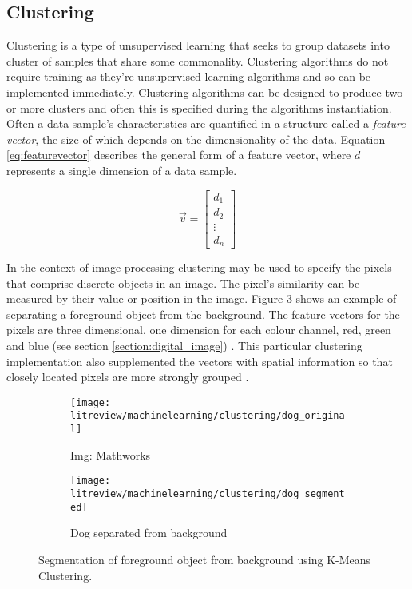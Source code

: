 \subsection{Clustering}
\label{subsection:clustering}
Clustering is a type of unsupervised learning that seeks to group datasets into cluster of samples that share some commonality. Clustering algorithms do not require training as they're unsupervised learning algorithms and so can be implemented immediately. Clustering algorithms can be designed to produce two or more clusters and often this is specified during the algorithms instantiation. Often a data sample's characteristics are quantified in a structure called a \emph{feature vector}, the size of which depends on the dimensionality of the data. Equation \ref{eq:featurevector} describes the general form of a feature vector, where $d$ represents a single dimension of a data sample. 

\begin{equation}
    \vec{v} = 
    \begin{bmatrix}
        d_1 \\
        d_2 \\
        \vdots \\ 
        d_n
    \end{bmatrix}
    \label{eq:featurevector}
\end{equation}

In the context of image processing clustering may be used to specify the pixels that comprise discrete objects in an image. The pixel's similarity can be measured by their value or position in the image. Figure \ref{fig:simple_cluster} shows an example of separating a foreground object from the background. The feature vectors for the pixels are three dimensional, one dimension for each colour channel, red, green and blue (see section \ref{section:digital_image}) \cite{patterns_machine_learning}. This particular clustering implementation also supplemented the vectors with spatial information so that closely located pixels are more strongly grouped \cite{matlab_kmeans_segment}.

\begin{figure}[htbp]
    \centering
     \begin{subfigure}[b]{0.45\textwidth}
        \texttt{[image: litreview/machinelearning/clustering/dog\_original]}
	\captionsetup{format = hang}
        \caption{Img: Mathworks}
        \label{fig:}
    \end{subfigure} 
    \begin{subfigure}[b]{0.45\textwidth}
        \texttt{[image: litreview/machinelearning/clustering/dog\_segmented]}	
	\captionsetup{format = hang}
        \caption{Dog separated from background \cite{matlab_kmeans_segment}}
        \label{fig:}
    \end{subfigure}
    \captionsetup{format = hang}
    \caption{Segmentation of foreground object from background using K-Means Clustering.}
    \label{fig:simple_cluster}
\end{figure}

    



